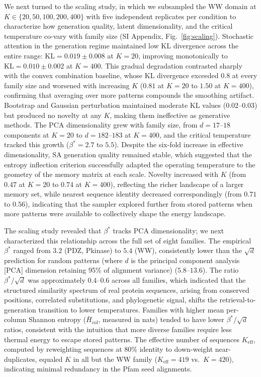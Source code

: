 We next turned to the scaling study, in which we subsampled the WW domain at $K \in \{20, 50, 100, 200, 400\}$ with five independent replicates per condition to characterize how generation quality, latent dimensionality, and the critical temperature co-vary with family size (SI Appendix, Fig.~\ref{fig:scaling}). Stochastic attention in the generation regime maintained low KL divergence across the entire range: $\mathrm{KL}{=}0.019 \pm 0.008$ at $K{=}20$, improving monotonically to $\mathrm{KL}{=}0.010 \pm 0.002$ at $K{=}400$. This gradual degradation contrasted sharply with the convex combination baseline, whose KL divergence exceeded $0.8$ at every family size and worsened with increasing $K$ ($0.81$ at $K{=}20$ to $1.50$ at $K{=}400$), confirming that averaging over more patterns compounds the smoothing artifact. Bootstrap and Gaussian perturbation maintained moderate KL values ($0.02$--$0.03$) but produced no novelty at any $K$, making them ineffective as generative methods. The PCA dimensionality grew with family size, from $d{=}17$--$18$ components at $K{=}20$ to $d{=}182$--$183$ at $K{=}400$, and the critical temperature tracked this growth ($\beta^*{=}2.7$ to $5.5$). Despite the six-fold increase in effective dimensionality, SA generation quality remained stable, which suggested that the entropy inflection criterion successfully adapted the operating temperature to the geometry of the memory matrix at each scale. Novelty increased with $K$ (from $0.47$ at $K{=}20$ to $0.74$ at $K{=}400$), reflecting the richer landscape of a larger memory set, while nearest sequence identity decreased correspondingly (from $0.71$ to $0.56$), indicating that the sampler explored further from stored patterns when more patterns were available to collectively shape the energy landscape.

The scaling study revealed that $\beta^*$ tracks PCA dimensionality; we next characterized this relationship across the full set of eight families. The empirical $\beta^*$ ranged from $3.2$ (PDZ, Pkinase) to $5.4$ (WW), consistently lower than the $\sqrt{d}$ prediction for random patterns (where $d$ is the principal component analysis [PCA] dimension retaining 95\% of alignment variance) ($5.8$--$13.6$). The ratio $\beta^*/\sqrt{d}$ was approximately $0.4$--$0.6$ across all families, which indicated that the structured similarity spectrum of real protein sequences, arising from conserved positions, correlated substitutions, and phylogenetic signal, shifts the retrieval-to-generation transition to lower temperatures. Families with higher mean per-column Shannon entropy ($\bar{H}_{\mathrm{col}}$, measured in nats) tended to have lower $\beta^*/\sqrt{d}$ ratios, consistent with the intuition that more diverse families require less thermal energy to escape stored patterns. The effective number of sequences $K_{\mathrm{eff}}$, computed by reweighting sequences at 80\% identity to down-weight near-duplicates, equaled $K$ in all but the WW family ($K_{\mathrm{eff}}{=}419$ vs.\ $K{=}420$), indicating minimal redundancy in the Pfam seed alignments.

